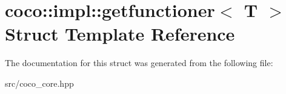 \hypertarget{structcoco_1_1impl_1_1getfunctioner}{}\section{coco\+:\+:impl\+:\+:getfunctioner$<$ T $>$ Struct Template Reference}
\label{structcoco_1_1impl_1_1getfunctioner}


The documentation for this struct was generated from the following file\+:\begin{DoxyCompactItemize}
\item 
src/coco\+\_\+core.\+hpp\end{DoxyCompactItemize}
